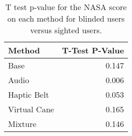 
\begin{table}[!htb]
\centering
\caption{T test p-value for the NASA score on each method for blinded users versus sighted users.}
\label{tab:ttest_nasa_score}
\begin{tabular}{lr}
\toprule
      Method &  T-Test P-Value \\
\midrule
        Base &           0.147 \\
       Audio &           0.006 \\
 Haptic Belt &           0.053 \\
Virtual Cane &           0.165 \\
     Mixture &           0.146 \\
\bottomrule
\end{tabular}
\end{table}

